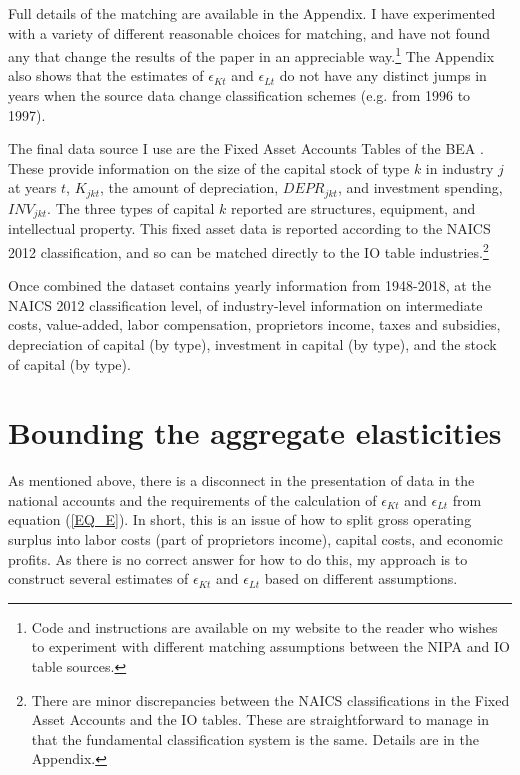 \documentclass[11pt]{article}
\begin{document}
Full details of the matching are available in the Appendix. I have experimented with a variety of different reasonable choices for matching, and have not found any that change the results of the paper in an appreciable way.\footnote{Code and instructions are available on my website to the reader who wishes to experiment with different matching assumptions between the NIPA and IO table sources.} The Appendix also shows that the estimates of $\epsilon_{Kt}$ and $\epsilon_{Lt}$ do not have any distinct jumps in years when the source data change classification schemes (e.g. from 1996 to 1997). 

The final data source I use are the Fixed Asset Accounts Tables of the BEA \citep{beacap,beagov}. These provide information on the size of the capital stock of type $k$ in industry $j$ at years $t$, $K_{jkt}$, the amount of depreciation, $DEPR_{jkt}$, and investment spending, $INV_{jkt}$. The three types of capital $k$ reported are structures, equipment, and intellectual property. This fixed asset data is reported according to the NAICS 2012 classification, and so can be matched directly to the IO table industries.\footnote{There are minor discrepancies between the NAICS classifications in the Fixed Asset Accounts and the IO tables. These are straightforward to manage in that the fundamental classification system is the same. Details are in the Appendix.} 

Once combined the dataset contains yearly information from 1948-2018, at the NAICS 2012 classification level, of industry-level information on intermediate costs, value-added, labor compensation, proprietors income, taxes and subsidies, depreciation of capital (by type), investment in capital (by type), and the stock of capital (by type).

\section{Bounding the aggregate elasticities}\label{SEC_bounding}
As mentioned above, there is a disconnect in the presentation of data in the national accounts and the requirements of the calculation of $\epsilon_{Kt}$ and $\epsilon_{Lt}$ from equation (\ref{EQ_E}). In short, this is an issue of how to split gross operating surplus into labor costs (part of proprietors income), capital costs, and economic profits. As there is no correct answer for how to do this, my approach is to construct several estimates of $\epsilon_{Kt}$ and $\epsilon_{Lt}$ based on different assumptions.
\end{document}
